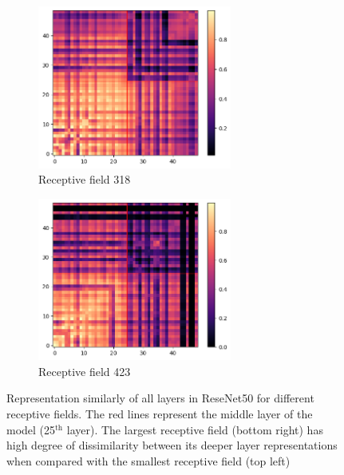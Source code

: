 \begin{figure}[H]
        \begin{subfigure}[b]{0.475\textwidth}   
            \centering 
            \includegraphics[width=0.7\textwidth]{images/resnet50_level3_similarity_cifar10.png}
            \caption[]%
            {{\small Receptive field 318}}    
            \label{fig:similarity_lvl3}
        \end{subfigure}
        \hfill
        \begin{subfigure}[b]{0.475\textwidth}   
            \centering 
            \includegraphics[width=0.7\textwidth]{images/resnet50_level4_similarity_cifar10.png}
            \caption[]%
            {{\small Receptive field 423}}    
            \label{fig:similarity_lvl4}
        \end{subfigure}
        \caption[ The average and standard deviation of critical parameters ]
        {\small Representation similarly of all layers in ReseNet50 for different receptive fields. The red lines
        represent the middle layer of the model (25$^{\text{th}}$ layer). The largest receptive field (bottom right)
      has high degree of dissimilarity between its deeper layer representations when compared with the smallest
    receptive field (top left)}
        \label{fig:similarity_resenet50}
    \end{figure}



